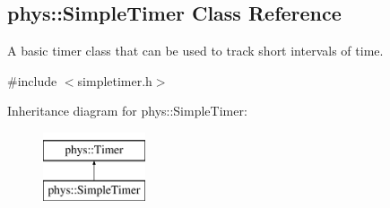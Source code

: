 \hypertarget{classphys_1_1SimpleTimer}{
\subsection{phys::SimpleTimer Class Reference}
\label{d0/d15/classphys_1_1SimpleTimer}
}


A basic timer class that can be used to track short intervals of time.  




{\ttfamily \#include $<$simpletimer.h$>$}

Inheritance diagram for phys::SimpleTimer:\begin{figure}[H]
\begin{center}
\leavevmode
\includegraphics[height=2.000000cm]{d0/d15/classphys_1_1SimpleTimer}
\end{center}
\end{figure}
